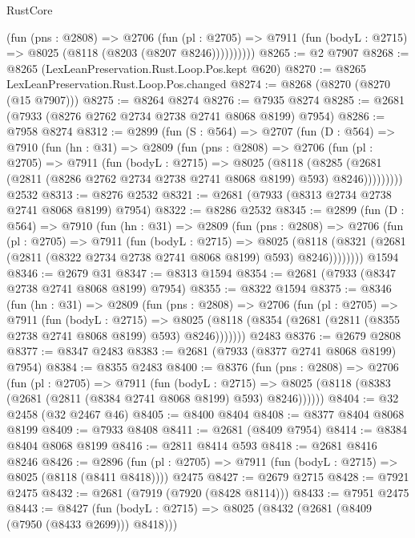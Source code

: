 \begin{lexlean}{RustCore}
\begin{coremodule}
            (fun (pns : @2808) =>
            @2706
              (fun (pl : @2705) =>
              @7911 (fun (bodyL : @2715) => @8025 (@8118 (@8203 (@8207 @8246))))))))))
@8265 := @2 @7907
@8268 := @8265 (LexLeanPreservation.Rust.Loop.Pos.kept @620)
@8270 := @8265 LexLeanPreservation.Rust.Loop.Pos.changed
@8274 := @8268 (@8270 (@8270 (@15 @7907)))
@8275 := @8264 @8274
@8276 := @7935 @8274
@8285 := @2681 (@7933 (@8276 @2762 @2734 @2738 @2741 @8068 @8199) @7954)
@8286 := @7958 @8274
@8312 := @2899
    (fun (S : @564) =>
    @2707
      (fun (D : @564) =>
      @7910
        (fun (hn : @31) =>
        @2809
          (fun (pns : @2808) =>
          @2706
            (fun (pl : @2705) =>
            @7911
              (fun (bodyL : @2715) =>
              @8025
                (@8118
                  (@8285
                    (@2681 (@2811 (@8286 @2762 @2734 @2738 @2741 @8068 @8199) @593) @8246)))))))))
    @2532
@8313 := @8276 @2532
@8321 := @2681 (@7933 (@8313 @2734 @2738 @2741 @8068 @8199) @7954)
@8322 := @8286 @2532
@8345 := @2899
    (fun (D : @564) =>
    @7910
      (fun (hn : @31) =>
      @2809
        (fun (pns : @2808) =>
        @2706
          (fun (pl : @2705) =>
          @7911
            (fun (bodyL : @2715) =>
            @8025
              (@8118 (@8321 (@2681 (@2811 (@8322 @2734 @2738 @2741 @8068 @8199) @593) @8246))))))))
    @1594
@8346 := @2679 @31
@8347 := @8313 @1594
@8354 := @2681 (@7933 (@8347 @2738 @2741 @8068 @8199) @7954)
@8355 := @8322 @1594
@8375 := @8346
    (fun (hn : @31) =>
    @2809
      (fun (pns : @2808) =>
      @2706
        (fun (pl : @2705) =>
        @7911
          (fun (bodyL : @2715) =>
          @8025 (@8118 (@8354 (@2681 (@2811 (@8355 @2738 @2741 @8068 @8199) @593) @8246)))))))
    @2483
@8376 := @2679 @2808
@8377 := @8347 @2483
@8383 := @2681 (@7933 (@8377 @2741 @8068 @8199) @7954)
@8384 := @8355 @2483
@8400 := @8376
    (fun (pns : @2808) =>
    @2706
      (fun (pl : @2705) =>
      @7911
        (fun (bodyL : @2715) =>
        @8025 (@8118 (@8383 (@2681 (@2811 (@8384 @2741 @8068 @8199) @593) @8246))))))
@8404 := @32 @2458 (@32 @2467 @46)
@8405 := @8400 @8404
@8408 := @8377 @8404 @8068 @8199
@8409 := @7933 @8408
@8411 := @2681 (@8409 @7954)
@8414 := @8384 @8404 @8068 @8199
@8416 := @2811 @8414 @593
@8418 := @2681 @8416 @8246
@8426 := @2896
    (fun (pl : @2705) => @7911 (fun (bodyL : @2715) => @8025 (@8118 (@8411 @8418))))
    @2475
@8427 := @2679 @2715
@8428 := @7921 @2475
@8432 := @2681 (@7919 (@7920 (@8428 @8114)))
@8433 := @7951 @2475
@8443 := @8427
    (fun (bodyL : @2715) => @8025 (@8432 (@2681 (@8409 (@7950 (@8433 @2699))) @8418)))

\end{coremodule}
\end{lexlean}
